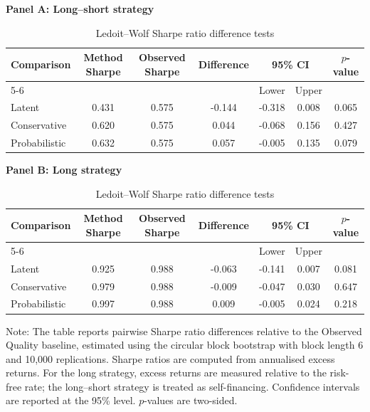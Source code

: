 \begin{table}[H]
\centering
\footnotesize
\renewcommand{\arraystretch}{1.12}
\setlength{\tabcolsep}{4pt}
\caption{Ledoit--Wolf Sharpe ratio difference tests}
\label{tab:main_methods_sharpe_difference_tests_recomputed}
\begin{threeparttable}
{\centering\textbf{Panel A: Long--short strategy}\par}
\vspace{0.4em}
\begin{tabular*}{\textwidth}{@{\extracolsep{\fill}}lcccccc}
\toprule
Comparison & Method Sharpe & Observed Sharpe & Difference & \multicolumn{2}{c}{95\% CI} & $p$-value \\
\cmidrule(lr){5-6}
& & & & Lower & Upper & \\
\midrule
Latent & 0.431 & 0.575 & -0.144 & -0.318 & 0.008 & 0.065 \\
Conservative & 0.620 & 0.575 & 0.044 & -0.068 & 0.156 & 0.427 \\
Probabilistic & 0.632 & 0.575 & 0.057 & -0.005 & 0.135 & 0.079 \\
\bottomrule
\end{tabular*}
\vspace{1em}
{\centering\textbf{Panel B: Long strategy}\par}
\vspace{0.4em}
\begin{tabular*}{\textwidth}{@{\extracolsep{\fill}}lcccccc}
\toprule
Comparison & Method Sharpe & Observed Sharpe & Difference & \multicolumn{2}{c}{95\% CI} & $p$-value \\
\cmidrule(lr){5-6}
& & & & Lower & Upper & \\
\midrule
Latent & 0.925 & 0.988 & -0.063 & -0.141 & 0.007 & 0.081 \\
Conservative & 0.979 & 0.988 & -0.009 & -0.047 & 0.030 & 0.647 \\
Probabilistic & 0.997 & 0.988 & 0.009 & -0.005 & 0.024 & 0.218 \\
\bottomrule
\end{tabular*}
\begin{tablenotes}[flushleft]
\scriptsize
\item Note: The table reports pairwise Sharpe ratio differences relative to the Observed Quality baseline, estimated using the \textcite{ledoit2008} circular block bootstrap with block length 6 and 10,000 replications. Sharpe ratios are computed from annualised excess returns. For the long strategy, excess returns are measured relative to the risk-free rate; the long--short strategy is treated as self-financing. Confidence intervals are reported at the 95\% level. $p$-values are two-sided.
\end{tablenotes}
\end{threeparttable}
\end{table}
